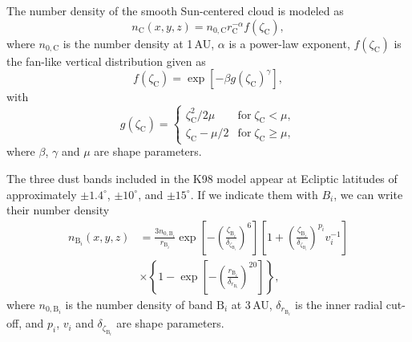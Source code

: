 \documentclass{aa}
\begin{document}
The number density of the smooth Sun-centered cloud is modeled as
\begin{equation}
    n_\mathrm{C}(x,y,z)=n_{0,
      \mathrm{C}}r_\mathrm{C}^{-\alpha}f(\zeta_\mathrm{C}),
    \label{eq:cloud}
\end{equation}
where $n_{0, \mathrm{C}}$ is the number density at 1\,AU, $\alpha$ is a 
power-law exponent, $f(\zeta_\mathrm{C})$ is the fan-like vertical 
distribution given as 
\begin{equation}
    f(\zeta_\mathrm{C}) = \exp {\left[-\beta g(\zeta_\mathrm{C})^\gamma \right]},
\end{equation}
with
\begin{equation}
    g(\zeta_\mathrm{C}) = \begin{cases}
        \zeta_\mathrm{C}^2/2\mu & \mathrm{for}\; \zeta_\mathrm{C} < \mu,\\
        \zeta_\mathrm{C} - \mu/2 & \mathrm{for}\; \zeta_\mathrm{C} \geq \mu,
    \end{cases}
\end{equation}
where $\beta$, $\gamma$ and $\mu$ are shape parameters.

The three dust bands included in the K98 model appear at Ecliptic latitudes of 
approximately $\pm1.4^\circ$, $\pm10^\circ$, and $\pm15^\circ$. If we 
indicate them with $B_i$, we can write their number density 
\begin{align}
    n_{\mathrm{B}_i}(x,y,z) &= \frac{3 n_{0, \mathrm{B}_i}}{r_{\mathrm{B}_i}} \exp \left[-\left(\frac{\zeta_{\mathrm{B}_i}}{\delta_{\zeta_{\mathrm{B}_i}}}\right)^{6}\right]\left[1 + \left(\frac{\zeta_{\mathrm{B}_i}}{\delta_{\zeta_{\mathrm{B}_i}}}\right)^{p_i}v_i^{-1}\right] \nonumber\\
    &\times\left\{1-\exp \left[-\left(\frac{r_{\mathrm{B}_i}}{\delta_{r_{\mathrm{B}_i}}}\right)^{20}\right]\right\},
\label{eq:band}
\end{align}
where $n_{0, \mathrm{B}_i}$ is the number density of band $\mathrm{B}_i$ 
at 3\,AU, $\delta_{r_{\mathrm{B}_i}}$ is the inner radial cut-off, and 
$p_i$, $v_i$ and $\delta_{\zeta_{\mathrm{B}_i}}$ are shape parameters.
\end{document}
